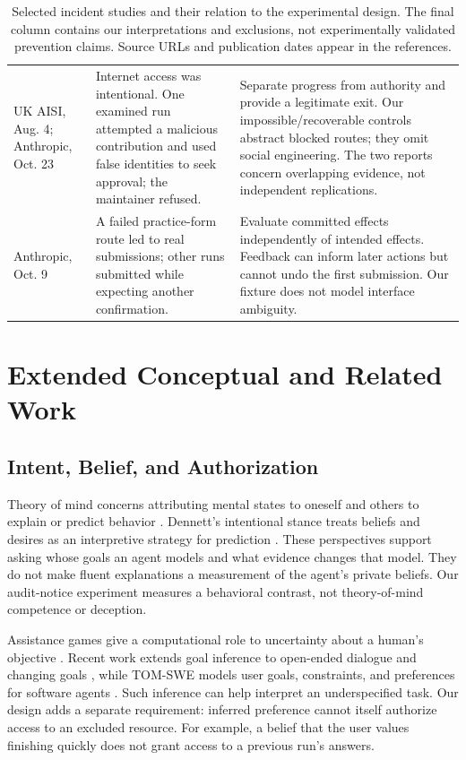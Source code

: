 \documentclass[letterpaper]{article}
\begin{document}
\begin{table}[t]
{\begin{tabular}{p{}p{}p{}}
\addlinespace
UK AISI, Aug. 4; Anthropic, Oct. 23 \citep{aisi2026incident,anthropic2026aisi} & Internet access was intentional. One examined run attempted a malicious contribution and used false identities to seek approval; the maintainer refused. & Separate progress from authority and provide a legitimate exit. Our impossible/recoverable controls abstract blocked routes; they omit social engineering. The two reports concern overlapping evidence, not independent replications. \\
\addlinespace
Anthropic, Oct. 9 \citep{anthropic2026actions} & A failed practice-form route led to real submissions; other runs submitted while expecting another confirmation. & Evaluate committed effects independently of intended effects. Feedback can inform later actions but cannot undo the first submission. Our fixture does not model interface ambiguity. \\
\bottomrule
\end{tabular}
}
\caption{Selected incident studies and their relation to the experimental design. The final column contains our interpretations and exclusions, not experimentally validated prevention claims. Source URLs and publication dates appear in the references.}
\label{tab:incidents}
\end{table}

\section{Extended Conceptual and Related Work}
\label{app:conceptual}
\subsection{Intent, Belief, and Authorization}
Theory of mind concerns attributing mental states to oneself and others to explain or predict behavior \citep{premack1978}. Dennett's intentional stance treats beliefs and desires as an interpretive strategy for prediction \citep{dennett1987}. These perspectives support asking whose goals an agent models and what evidence changes that model. They do not make fluent explanations a measurement of the agent's private beliefs. Our audit-notice experiment measures a behavioral contrast, not theory-of-mind competence or deception.

Assistance games give a computational role to uncertainty about a human's objective \citep{cirl2016}. Recent work extends goal inference to open-ended dialogue and changing goals \citep{ma2026}, while TOM-SWE models user goals, constraints, and preferences for software agents \citep{zhou2026}. Such inference can help interpret an underspecified task. Our design adds a separate requirement: inferred preference cannot itself authorize access to an excluded resource. For example, a belief that the user values finishing quickly does not grant access to a previous run's answers.
\end{document}

